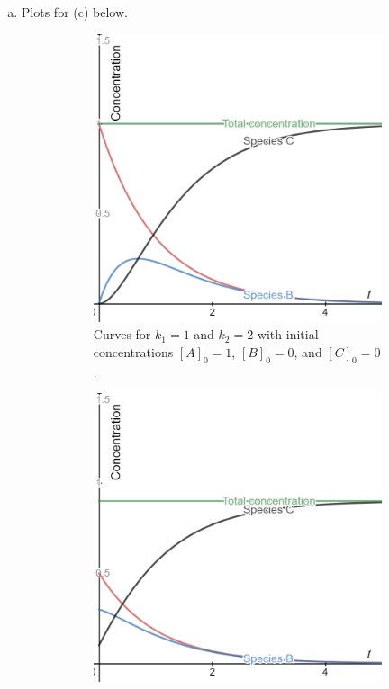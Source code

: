 \documentclass[12pt]{article} %
\begin{document}
\begin{solution}
\begin{enumerate}[(a)]
    \item Plots for (c) below.
    \begin{figure}[H]
        \centering
        \begin{subfigure}[b]{0.3\textwidth}
            \centering
            \includegraphics[width=\textwidth]{k11k22.png}
            \caption{Curves for $k_1=1$ and $k_2=2$ with initial concentrations $[A]_0=1$, $[B]_0=0$, and $[C]_0=0$. }
        \end{subfigure}
        \hspace*{2cm}
        \begin{subfigure}[b]{0.3\textwidth}
            \centering
            \includegraphics[width=\textwidth]{k11k22_other.png}

\end{subfigure}
\end{figure}
\end{enumerate}
\end{solution}
\end{document}
